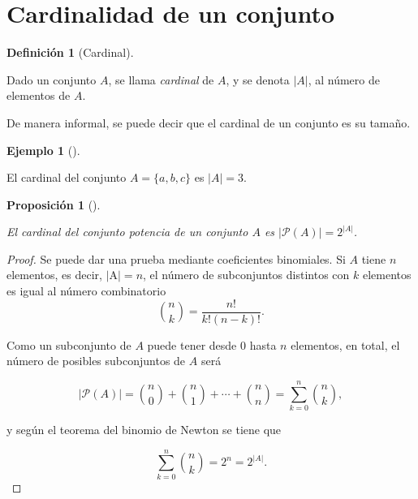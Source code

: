 \documentclass[
  a4paper,
]{scrreport}
\theoremstyle{definition}
\newtheorem{example}{Ejemplo}[chapter]
\theoremstyle{plain}
\theoremstyle{definition}
\newtheorem{definition}{Definición}[chapter]
\theoremstyle{definition}
\theoremstyle{plain}
\theoremstyle{plain}
\newtheorem{proposition}{Proposición}[chapter]
\theoremstyle{remark}
\begin{document}
\section{Cardinalidad de un conjunto}\label{cardinalidad-de-un-conjunto}

\begin{definition}[Cardinal]\protect\hypertarget{def-cardinal-conjunto}{}\label{def-cardinal-conjunto}

Dado un conjunto \(A\), se llama \emph{cardinal} de \(A\), y se denota
\(|A|\), al número de elementos de \(A\).

\end{definition}

De manera informal, se puede decir que el cardinal de un conjunto es su
tamaño.

\begin{example}[]\protect\hypertarget{exm-cardinal}{}\label{exm-cardinal}

El cardinal del conjunto \(A=\{a, b, c\}\) es \(|A|=3\).

\end{example}

\begin{proposition}[]\protect\hypertarget{prp-cardinal-conjunto-potencia}{}\label{prp-cardinal-conjunto-potencia}

El cardinal del conjunto potencia de un conjunto \(A\) es
\(|\mathcal{P}(A)| = 2^{|A|}\).

\end{proposition}

\begin{tcolorbox}[enhanced jigsaw, leftrule=.75mm, colbacktitle=quarto-callout-note-color!10!white, toprule=.15mm, opacityback=0, opacitybacktitle=0.6, toptitle=1mm, breakable, bottomtitle=1mm, colframe=quarto-callout-note-color-frame, rightrule=.15mm, titlerule=0mm, title=\textcolor{quarto-callout-note-color}{\faInfo}\hspace{0.5em}{Demostración}, arc=.35mm, left=2mm, bottomrule=.15mm, colback=white, coltitle=black]

\begin{proof}
Se puede dar una prueba mediante coeficientes binomiales. Si \(A\) tiene
\(n\) elementos, es decir, \(|\)A\(|=n\), el número de subconjuntos
distintos con \(k\) elementos es igual al número combinatorio
\[\binom{n}{k}=\frac{n!}{k!(n-k)!}.\]

Como un subconjunto de \(A\) puede tener desde \(0\) hasta \(n\)
elementos, en total, el número de posibles subconjuntos de \(A\) será

\[|\mathcal{P}(A)|=\binom{n}{0}+\binom{n}{1}+\cdots + \binom{n}{n} = \sum_{k=0}^n \binom{n}{k},\]

y según el teorema del binomio de Newton se tiene que

\[\sum_{k=0}^n \binom{n}{k}=2^n = 2^{|A|}.\]
\end{proof}

\end{tcolorbox}
\end{document}
